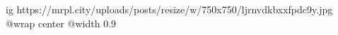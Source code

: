  
 
 
 
 

\ifcmt
  ig https://mrpl.city/uploads/posts/resize/w/750x750/ljrnvdkbxxfpdc9y.jpg
  @wrap center
  @width 0.9
\fi
